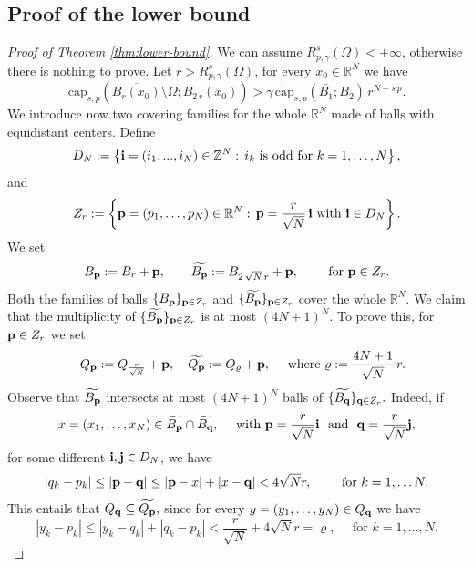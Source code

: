 \documentclass{amsart}
\theoremstyle{definition}
\numberwithin{equation}{section}
\begin{document}
\subsection{Proof of the lower bound}
\begin{proof}[Proof of Theorem \ref{thm:lower-bound}]
	We can assume $R^s_{p, \gamma}(\Omega)< +\infty$, otherwise there is nothing to prove. Let $r > R^s_{p, \gamma}(\Omega)$, for every $x_0 \in \mathbb{R}^N$ we have \begin{equation} \label{ipotesi-gamma-fat}
		\widetilde{\mathrm{cap}}_{s,p}\left(\overline{B_r(x_0)} \setminus \Omega; B_{2\,r}(x_0)\right)  > \gamma\,\widetilde{\mathrm{cap}}_{s,p}\left(\overline{B_1}; B_{2}\right)\,r^{N-s\,p}.
	\end{equation}
	We introduce now two covering families for the whole $\mathbb{R}^N$ made of balls with equidistant centers. 
	Define	\[
	D_{N}:= \left\{{\bf i} = (i_1,...,i_N)\in \mathbb{Z}^N :\, i_k \mbox{ is odd for } k = 1, \ldots, N\right\},  
	\]
	and
	\[
	Z_r := \left\{{\bf p} = (p_1, \ldots, p_N) \in \mathbb{R}^N :\, {\bf p} = \frac{r}{\sqrt{N}}\,{\bf i} \mbox{ with }  {\bf i} \in D_N\right\}.
	\]
	We set \[
	B_{\bf p} := B_{r} + {\bf p}, \qquad  \widetilde{B_{\bf p}} := B_{2\,\sqrt{N}\,r} + {\bf p}, \qquad  \mbox{ for } {\bf p} \in Z_r.
	\]
	Both the families of balls $\{B_{\bf p}\}_{{\bf p} \in Z_r}$ and $\{\widetilde{B_{\bf p}}\}_{{\bf p} \in Z_r}$ cover the whole $\mathbb{R}^N$. We claim that the multiplicity of $\{\widetilde{B_{\bf p}}\}_{{\bf p} \in Z_r}$ is at most $(4N+1)^N$. To prove this, for ${\bf p} \in Z_r$ we set 
	\[
	\quad Q_{\bf p} := Q_{\frac{r}{\sqrt{N}}} + {\bf p}, \quad \widetilde{Q_{\bf p}} := Q_{\varrho} + {\bf p}, \quad \mbox{ where } \varrho := \frac{4N+1}{\sqrt{N}}\,r.
	\]
	Observe that $\widetilde{B_{{\bf p}}}$ intersects at most $(4N+1)^N$ balls of $\{\widetilde{ B_{\bf q}}\}_{{\bf q} \in Z_r}.$ Indeed, if
	\[
	x = (x_1, \ldots, x_N) \in \widetilde{B_{\bf p}} \cap \widetilde{B_{\bf q}}, \quad \mbox{ with } {\bf p} = \frac{r}{\sqrt{N}}{\bf i}\,\, \mbox{ and }\,\, {\bf q} = \frac{r}{\sqrt{N}}{\bf j},
	\]
	for some different ${\bf i}, {\bf j} \in D_N$, we have 
	\[
	|q_k - p_k| \le \left|{\bf p} - {\bf q}\right| \le \left|{\bf p} - x \right| + \left| x -  {\bf q}\right| < 4\sqrt{N}r, \qquad \mbox{ for } k=1, \ldots N. 
	\]
	This entails that 
	$
	Q_{\bf q} \subseteq \widetilde{Q_{\bf p}},
	$
	since for every $y = (y_1, \ldots, y_N) \in Q_{\bf q}$ we have 
	\[
	|y_k - p_k| \le |y_k - q_k| + |q_k - p_k| < \frac{r}{\sqrt{N}} + 4\sqrt{N}r = \varrho, \quad \mbox{ for } k=1, \ldots, N. 
\]
\end{proof}
\end{document}
